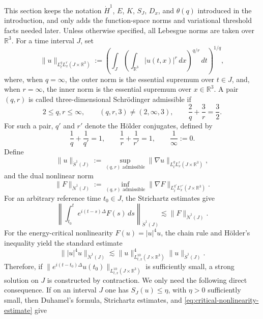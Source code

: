 \documentclass[smallextended,envcountsect,nospthms]{svjour3}
\numberwithin{equation}{section}
\theoremstyle{spbreak}
\theoremstyle{spdefbreak}
\theoremstyle{spdefbreak}
\newcommand{\R}{\mathbb R}
\newcommand{\Nd}{\dot N^1}
\newcommand{\Sd}{\dot S^1}
\begin{document}
This section keeps the notation $\dot H^1$, $E$, $K$, $S_J$, $D_x$, and $\theta(q)$ introduced in the introduction, and only adds the function-space norms and variational threshold facts needed later. Unless otherwise specified, all Lebesgue norms are taken over $\R^3$. For a time interval $J$, set
\begin{equation*}
  \|u\|_{L_t^qL_x^r(J\times\R^3)}
  :=\left(\int_J\left(\int_{\R^3}|u(t,x)|^r\,dx\right)^{q/r}\,dt\right)^{1/q},
\end{equation*}
where, when $q=\infty$, the outer norm is the essential supremum over $t\in J$, and, when $r=\infty$, the inner norm is the essential supremum over $x\in\R^3$. A pair $(q,r)$ is called three-dimensional Schr\"odinger admissible if
\begin{equation*}
  2\le q,r\le\infty,
  \qquad (q,r,3)\ne(2,\infty,3),
  \qquad \frac2q+\frac3r=\frac32.
\end{equation*}
For such a pair, $q'$ and $r'$ denote the H\"older conjugates, defined by
\begin{equation*}
  \frac1q+\frac1{q'}=1,
  \qquad
  \frac1r+\frac1{r'}=1,
  \qquad \frac1\infty:=0.
\end{equation*}
Define
\begin{equation*}
  \|u\|_{\Sd(J)}:=\sup_{(q,r)\text{ admissible}}\|\nabla u\|_{L_t^qL_x^r(J\times\R^3)},
\end{equation*}
and the dual nonlinear norm
\begin{equation*}
  \|F\|_{\Nd(J)}
  :=\inf_{(q,r)\text{ admissible}}\|\nabla F\|_{L_t^{q'}L_x^{r'}(J\times\R^3)}.
\end{equation*}
For an arbitrary reference time $t_0\in J$, the Strichartz estimates give
\begin{equation*}
  \left\|\int_{t_0}^{t}e^{i(t-s)\Delta}F(s)\,ds\right\|_{\Sd(J)}
  \lesssim \|F\|_{\Nd(J)}.
\end{equation*}
For the energy-critical nonlinearity $F(u)=|u|^4u$, the chain rule and H\"older's inequality yield the standard estimate
\begin{equation}\label{eq:critical-nonlinearity-estimate}
  \||u|^4u\|_{\Nd(J)}
  \lesssim \|u\|_{L_{t,x}^{10}(J\times\R^3)}^4\|u\|_{\Sd(J)}.
\end{equation}
Therefore, if $\|e^{i(t-t_0)\Delta}u(t_0)\|_{L_{t,x}^{10}(J\times\R^3)}$ is sufficiently small, a strong solution on $J$ is constructed by contraction. We only need the following direct consequence. If on an interval $J$ one has $S_J(u)\le\eta$, with $\eta>0$ sufficiently small, then Duhamel's formula, Strichartz estimates, and \eqref{eq:critical-nonlinearity-estimate} give
\end{document}
